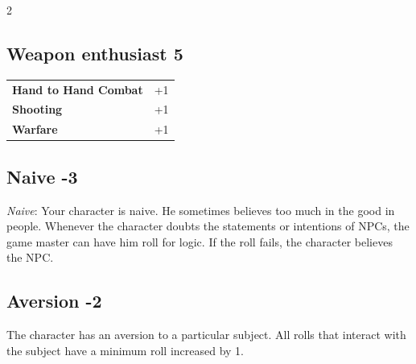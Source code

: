 \begin{multicols}{2}
\begin{tcolorbox}
\vspace{3mm}



\end{tcolorbox}

\begin{tcolorbox}
    \subsection*{Weapon enthusiast \hfill \small{5 }}
    \tcblower




\begin{tabular}{@{}ll@{}}
    \textbf{Hand to Hand Combat} & +1\\
    \textbf{Shooting} & +1\\
    \textbf{Warfare} & +1\\
\end{tabular}


\end{tcolorbox}

\begin{tcolorbox}
    \subsection*{Naive \hfill \small{-3 }}
    \tcblower
\textit{Naive}: Your character is naive. He sometimes believes too much in the good in people. Whenever the character doubts the statements or intentions of NPCs, the game master can have him roll for logic. If the roll fails, the character believes the NPC.


\vspace{3mm}



\end{tcolorbox}

\begin{tcolorbox}
    \subsection*{Aversion \hfill \small{-2 }}
    \tcblower
The character has an aversion to a particular subject. All rolls that interact with the subject have a minimum roll increased by 1.



\end{tcolorbox}
\end{multicols}

